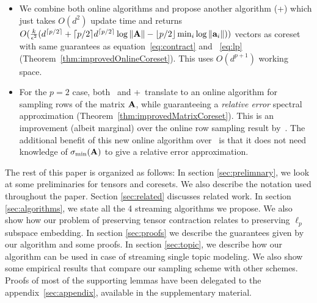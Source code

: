 \begin{itemize}
    \item We combine both online algorithms and propose another algorithm (\online+) which just takes $O(d^2)$ update time and returns $O(\frac{k}{\epsilon^{2}} (d^{\lceil p/2 \rceil}+\lceil p/2 \rceil d^{\lceil p/2 \rceil}\log\|\mathbf{A}\| - \lfloor p/2 \rfloor\min_{i}\log\|\mathbf{a}_{i}\|))$ vectors as coreset with same guarantees as equation~\eqref{eq:contract} and ~\eqref{eq:lp} (Theorem~\ref{thm:improvedOnlineCoreset}). This uses $O(d^{p+1})$ working space.
    \item For the $p=2$ case, both \online~and \online+~translate to an online algorithm for sampling rows of the matrix $\mathbf{A}$, while guaranteeing a {\em relative error} spectral approximation (Theorem~\ref{thm:improvedMatrixCoreset}). This is an improvement (albeit marginal) over the online row sampling result by~\cite{cohen2016online}. The additional benefit of this new online algorithm over~\cite{cohen2016online} is that it does not need knowledge of $\sigma_{\min}(\mathbf{A})$ to give a relative error approximation. 
\end{itemize}
The rest of this paper is organized as follows: In section \ref{sec:prelimnary}, we look at some preliminaries for tensors and coresets. We also describe the notation used throughout the paper. Section \ref{sec:related} discusses related work. In section \ref{sec:algorithms}, we state all the 4 streaming algorithms we propose. We also show how our problem of preserving tensor contraction relates to preserving $\ell_{p}$ subspace embedding. In section \ref{sec:proofs} we describe the guarantees given by our algorithm and some proofs. 
In section \ref{sec:topic}, we describe how our algorithm can be used in case of streaming single topic modeling. We also show some empirical results that compare our sampling scheme with other schemes. Proofs of most of the supporting lemmas have been delegated to the appendix~\ref{sec:appendix}, available in the supplementary material.
